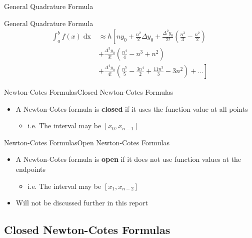 \documentclass{beamer}
\begin{document}
\begin{frame}{General Quadrature Formula \cite{general_quadrature}}
  \begin{definition}{General Quadrature Formula}
    \begin{equation}\label{quadrature}
      \begin{split}
        \int_{a}^{b} f(x) \mathop{dx} &\approx h\left[ny_0 + \frac{n^2}{2}\Delta y_0 + \frac{\Delta^2 y_0}{2!}\left(\frac{n^3}{3} - \frac{n^2}{2}\right) \right. \\
        &+ \frac{\Delta^3 y_0}{3!}\left(\frac{n^4}{4} - n^3 + n^2\right) \\ 
        &+ \left. \frac{\Delta^4 y_0}{4!}\left(\frac{n^5}{5} - \frac{3n^4}{2} + \frac{11n^3}{3} - 3n^2\right) + \dots \right]
      \end{split}
    \end{equation}
  \end{definition}
\end{frame}

\begin{frame}{Newton-Cotes Formulas}{Closed Newton-Cotes Formulas}
  \begin{itemize}
    \item A Newton-Cotes formula is \textbf{closed} if it uses the function value at all points
    \begin{itemize}
      \item i.e. The interval may be $[x_0,x_{n-1}]$
    \end{itemize} 
  \end{itemize}
\end{frame}

\begin{frame}{Newton-Cotes Formulas}{Open Newton-Cotes Formulas}
  \begin{itemize}
    \item A Newton-Cotes formula is \textbf{open} if it does not use function values at the endpoints
    \begin{itemize}
      \item i.e. The interval may be $[x_1,x_{n-2}]$
    \end{itemize} 
    \item Will not be discussed further in this report
  \end{itemize}
\end{frame}

\subsection{Closed Newton-Cotes Formulas}
\end{document}
